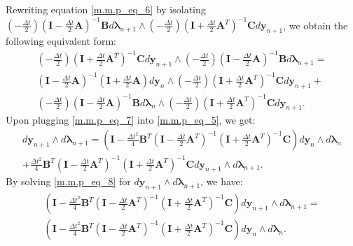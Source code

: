 \documentclass[a4paper, 10pt]{article}
\begin{document}
Rewriting equation \eqref{m.m.p_eq_6} by isolating $(-\tfrac{\Delta{t}}{2})(\bm{I}-\tfrac{\Delta{t}}{2}\bm{A})^{-1}\bm{B}d\bm{\lambda}_{n+1} \wedge (-\tfrac{\Delta{t}}{2})(\bm{I}+\tfrac{\Delta{t}}{2}\bm{A}^{T})^{-1}\bm{C}d\bm{y}_{n+1}$, we obtain the following equivalent form:
\begin{multline}\label{m.m.p_eq_7}
 (-\tfrac{\Delta{t}}{2})(\bm{I}+\tfrac{\Delta{t}}{2}\bm{A}^{T})^{-1}\bm{C}d\bm{y}_{n+1} \wedge (-\tfrac{\Delta{t}}{2})(\bm{I}-\tfrac{\Delta{t}}{2}\bm{A})^{-1}\bm{B}d\bm{\lambda}_{n+1} = \\
 (\bm{I}-\tfrac{\Delta{t}}{2}\bm{A})^{-1}(\bm{I}+\tfrac{\Delta{t}}{2}\bm{A})d\bm{y}_{n} \wedge (-\tfrac{\Delta{t}}{2})(\bm{I}+\tfrac{\Delta{t}}{2}\bm{A}^{T})^{-1}\bm{C}d\bm{y}_{n+1} + \\
 (-\tfrac{\Delta{t}}{2})(\bm{I}-\tfrac{\Delta{t}}{2}\bm{A})^{-1}\bm{B}d\bm{\lambda}_{n} \wedge (-\tfrac{\Delta{t}}{2})(\bm{I}+\tfrac{\Delta{t}}{2}\bm{A}^{T})^{-1}\bm{C}d\bm{y}_{n+1}.
\end{multline}
Upon plugging \eqref{m.m.p_eq_7} into \eqref{m.m.p_eq_5}, we get:
\begin{multline}\label{m.m.p_eq_8}
    d\bm{y}_{n+1} \wedge d\bm{\lambda}_{n+1} = \left(\bm{I}-\tfrac{\Delta{t}^2}{4}\bm{B}^{T}(\bm{I}-\tfrac{\Delta{t}}{2}\bm{A}^{T})^{-1}(\bm{I}+\tfrac{\Delta{t}}{2}\bm{A}^{T})^{-1}\bm{C}\right) d\bm{y}_{n} \wedge d\bm{\lambda}_{n} \\
    +  \tfrac{\Delta{t}^2}{4}\bm{B}^{T}(\bm{I}-\tfrac{\Delta{t}}{2}\bm{A}^{T})^{-1}(\bm{I}+\tfrac{\Delta{t}}{2}\bm{A}^{T})^{-1}\bm{C} d\bm{y}_{n+1} \wedge d\bm{\lambda}_{n+1}.
\end{multline}
By solving \eqref{m.m.p_eq_8} for $d\bm{y}_{n+1} \wedge d\bm{\lambda}_{n+1}$, we have:
\begin{multline}\label{m.m.p_eq_9}
    \left(\bm{I}-\tfrac{\Delta{t}^2}{4}\bm{B}^{T}(\bm{I}-\tfrac{\Delta{t}}{2}\bm{A}^{T})^{-1}(\bm{I}+\tfrac{\Delta{t}}{2}\bm{A}^{T})^{-1}\bm{C}\right) d\bm{y}_{n+1} \wedge d\bm{\lambda}_{n+1}  = \\
    \left(\bm{I}-\tfrac{\Delta{t}^2}{4}\bm{B}^{T}(\bm{I}-\tfrac{\Delta{t}}{2}\bm{A}^{T})^{-1}(\bm{I}+\tfrac{\Delta{t}}{2}\bm{A}^{T})^{-1}\bm{C}\right) d\bm{y}_{n} \wedge d\bm{\lambda}_{n}.
\end{multline}
\end{document}
